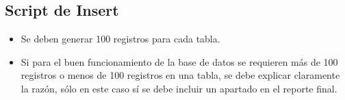     
\subsection{Script de Insert}
\begin{itemize}
    \item Se deben generar 100 registros para cada tabla.
    \item Si para el buen funcionamiento de la base de datos se requieren más de 100 registros o
            menos de 100 registros en una tabla, se debe explicar claramente la razón, sólo en este caso
            sí se debe incluir un apartado en el reporte final.
\end{itemize}